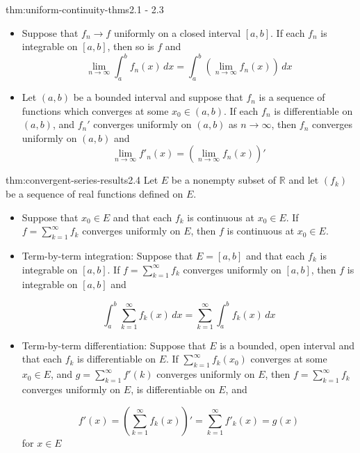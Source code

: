 \documentclass[landscape, 8pt]{extarticle}
\begin{document}
\begin{multicols}{3}
\begin{thm}{thm:uniform-continuity-thms}{2.1 - 2.3}
\begin{itemize}
		\item[\textbf{2.2}:] Suppose that $f_{n}\to f$ uniformly on a closed interval $[a,b]$. If each $f_{n}$ is integrable on $[a,b]$, then so is $f$ and 
	\[\lim_{n \to \infty} \int_{a}^{b} f_{n}(x) \, dx =\int_{a}^{b} \left(\lim_{n \to \infty} f_{n}(x)\right) \, dx \]
		\item[\textbf{2.3}:] Let $(a,b)$ be a bounded interval and suppose that $f_{n}$ is a sequence of functions which converges at some $x_{0}\in(a,b)$. If each $f_{n}$ is differentiable on $(a,b)$, and $f_{n}'$ converges uniformly on $(a,b)$ as $n\to\infty$, then $f_{n}$ converges uniformly on $(a,b)$ and
			\vspace{-2pt}
			\[\lim_{n \to \infty} f'_{n}(x)=\left(\lim_{n \to \infty} f_{n}(x)\right)'\]
	\end{itemize}
\end{thm}


\begin{thm}{thm:convergent-series-results}{2.4}
	Let $E$ be a nonempty subset of $\mathbb{R}$ and let $(f_{k})$ be a sequence of real functions defined on $E$.

	\begin{itemize}
		\setlength\itemsep{0em}
		\item Suppose that $x_{0}\in E$ and that each $f_{k}$ is continuous at $x_{0}\in E$. If $f=\displaystyle\sum_{k=1}^{\infty}f_{k}$ converges uniformly on $E$, then $f$ is continuous at $x_{0}\in E$.

		\item Term-by-term integration: Suppose that $E=[a,b]$ and that each $f_{k}$ is integrable on $[a,b]$. If $f=\displaystyle\sum_{k=1}^{\infty} f_{k}$ converges uniformly on $[a,b]$, then $f$ is integrable on $[a,b]$ and

		\[\int_{a}^{b} \sum_{k=1}^{\infty} f_{k}(x) \, dx =\sum_{k=1}^{\infty} \int_{a}^{b} f_{k}(x) \, dx \]
		\item Term-by-term differentiation: Suppose that $E$ is a bounded, open interval and that each $f_{k}$ is differentiable on $E$. If $\sum_{k=1}^{\infty}f_{k}(x_{0})$ converges at some $x_{0}\in E$, and $g=\sum_{k=1}^{\infty}f'(k)$ converges uniformly on $E$, then $f= \sum_{k=1}^{\infty}f_{k}$ converges uniformly on $E$, is differentiable on $E$, and

		\[f'(x)=\left( \sum_{k=1}^{\infty} f_{k}(x) \right)'=\sum_{k=1}^{\infty} f'_{k}(x)=g(x)\]
		for $x\in E$

	\end{itemize}
\end{thm}


\end{multicols}
\end{document}

